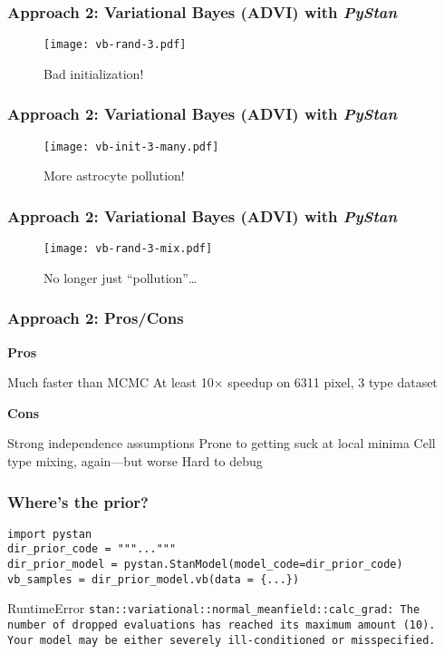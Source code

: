 \documentclass{beamer}
\newcommand{\importfig}[1]{{#1.tex}}
\begin{document}
\begin{frame}
    \frametitle{Approach 2: Variational Bayes (ADVI) with \textit{PyStan}}
    \begin{figure}[!htbp]
        \centering
        \texttt{[image: vb-rand-3.pdf]}
        \caption{Bad initialization!}
    \end{figure}
\end{frame}

\begin{frame}
    \frametitle{Approach 2: Variational Bayes (ADVI) with \textit{PyStan}}
    \begin{figure}[!htbp]
        \centering
        \texttt{[image: vb-init-3-many.pdf]}
        \caption{More astrocyte pollution!}
    \end{figure}
\end{frame}

\begin{frame}
    \frametitle{Approach 2: Variational Bayes (ADVI) with \textit{PyStan}}
    \begin{figure}[!htbp]
        \centering
        \texttt{[image: vb-rand-3-mix.pdf]}
        \caption{No longer just ``pollution''\ldots}
    \end{figure}
\end{frame}

\begin{frame}
    \frametitle{Approach 2: Pros/Cons}
    \begin{itemize}
        \ii
        \textbf{Pros}
        \begin{itemize}
            \ii Much \alert{faster} than MCMC
            \ii At least 10$\times$ speedup on 6311 pixel, 3 type dataset
        \end{itemize}
        \ii
        \textbf{Cons}
        \begin{itemize}
            \ii Strong independence assumptions
            \ii Prone to getting suck at local minima
            \ii Cell type mixing, again---but worse
            \ii Hard to debug
        \end{itemize}
    \end{itemize}
\end{frame}

\begin{frame}[fragile]
    \frametitle{Where's the prior?}
\begin{verbatim}
import pystan
dir_prior_code = """..."""
dir_prior_model = pystan.StanModel(model_code=dir_prior_code)
vb_samples = dir_prior_model.vb(data = {...})
\end{verbatim}
    \begin{alertblock}{{RuntimeError}}
        \footnotesize
        \texttt{stan::variational::normal\_meanfield::calc\_grad: The number of dropped evaluations has reached its maximum amount (10). Your model may be either severely ill-conditioned or misspecified.}
    \end{alertblock}
\end{frame}
\end{document}
